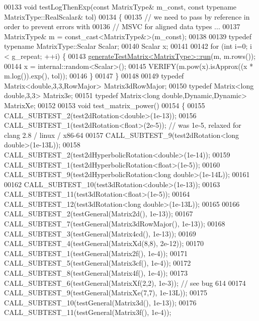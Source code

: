 \begin{DoxyCode}
00133 \textcolor{keywordtype}{void} testLogThenExp(\textcolor{keyword}{const} MatrixType& m\_const, \textcolor{keyword}{const} \textcolor{keyword}{typename} MatrixType::RealScalar& tol)
00134 \{
00135   \textcolor{comment}{// we need to pass by reference in order to prevent errors with}
00136   \textcolor{comment}{// MSVC for aligned data types ...}
00137   MatrixType& m = \textcolor{keyword}{const\_cast<}MatrixType&\textcolor{keyword}{>}(m\_const);
00138 
00139   \textcolor{keyword}{typedef} \textcolor{keyword}{typename} MatrixType::Scalar Scalar;
00140   Scalar x;
00141 
00142   \textcolor{keywordflow}{for} (\textcolor{keywordtype}{int} i=0; i < g\_repeat; ++i) \{
00143     \hyperlink{structgenerate_test_matrix}{generateTestMatrix<MatrixType>::run}(m, m.rows());
00144     x = internal::random<Scalar>();
00145     VERIFY(m.pow(x).isApprox((x * m.log()).exp(), tol));
00146   \}
00147 \}
00148 
00149 \textcolor{keyword}{typedef} Matrix<double,3,3,RowMajor>         Matrix3dRowMajor;
00150 \textcolor{keyword}{typedef} Matrix<long double,3,3>             Matrix3e;
00151 \textcolor{keyword}{typedef} Matrix<long double,Dynamic,Dynamic> MatrixXe;
00152  
00153 \textcolor{keywordtype}{void} test\_matrix\_power()
00154 \{
00155   CALL\_SUBTEST\_2(test2dRotation<double>(1e-13));
00156   CALL\_SUBTEST\_1(test2dRotation<float>(2e-5));  \textcolor{comment}{// was 1e-5, relaxed for clang 2.8 / linux / x86-64}
00157   CALL\_SUBTEST\_9(test2dRotation<long double>(1e-13L));
00158   CALL\_SUBTEST\_2(test2dHyperbolicRotation<double>(1e-14));
00159   CALL\_SUBTEST\_1(test2dHyperbolicRotation<float>(1e-5));
00160   CALL\_SUBTEST\_9(test2dHyperbolicRotation<long double>(1e-14L));
00161 
00162   CALL\_SUBTEST\_10(test3dRotation<double>(1e-13));
00163   CALL\_SUBTEST\_11(test3dRotation<float>(1e-5));
00164   CALL\_SUBTEST\_12(test3dRotation<long double>(1e-13L));
00165 
00166   CALL\_SUBTEST\_2(testGeneral(Matrix2d(),         1e-13));
00167   CALL\_SUBTEST\_7(testGeneral(Matrix3dRowMajor(), 1e-13));
00168   CALL\_SUBTEST\_3(testGeneral(Matrix4cd(),        1e-13));
00169   CALL\_SUBTEST\_4(testGeneral(MatrixXd(8,8),      2e-12));
00170   CALL\_SUBTEST\_1(testGeneral(Matrix2f(),         1e-4));
00171   CALL\_SUBTEST\_5(testGeneral(Matrix3cf(),        1e-4));
00172   CALL\_SUBTEST\_8(testGeneral(Matrix4f(),         1e-4));
00173   CALL\_SUBTEST\_6(testGeneral(MatrixXf(2,2),      1e-3)); \textcolor{comment}{// see bug 614}
00174   CALL\_SUBTEST\_9(testGeneral(MatrixXe(7,7),      1e-13L));
00175   CALL\_SUBTEST\_10(testGeneral(Matrix3d(),        1e-13));
00176   CALL\_SUBTEST\_11(testGeneral(Matrix3f(),        1e-4));

\end{DoxyCode}
